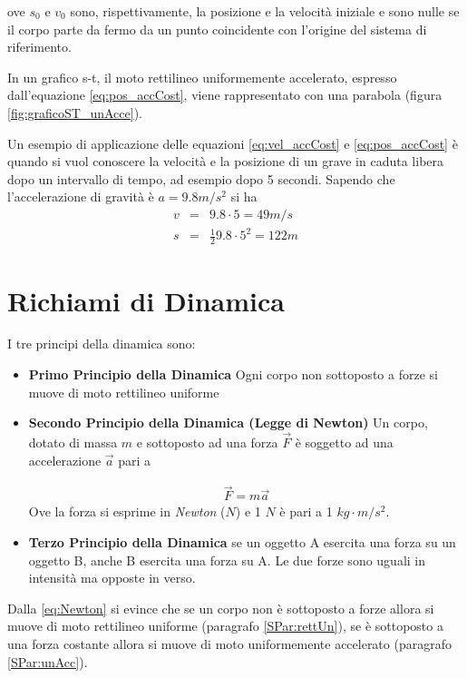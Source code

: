 \documentclass[17pt]{extarticle}
\begin{document}
ove $s_0$ e $v_0$ sono, rispettivamente, la posizione e la velocità iniziale e sono nulle se il corpo parte da fermo da un punto coincidente con l'origine del sistema di riferimento. 

In un grafico s-t, il moto rettilineo uniformemente accelerato, espresso dall'equazione \ref{eq:pos_accCost}, viene rappresentato con una parabola (figura \ref{fig:graficoST_unAcce}).



Un esempio di applicazione delle equazioni \ref{eq:vel_accCost} e \ref{eq:pos_accCost} è quando si vuol conoscere la velocità e la posizione di un grave in caduta libera dopo un intervallo di tempo, ad esempio dopo 5 secondi. Sapendo che l'accelerazione di gravità è $a = 9.8m/s^2$ si ha
\begin{eqnarray}
	v & = & 9.8\cdot 5 = 49 m/s\\
	s & = & \frac{1}{2}9.8\cdot 5^2 = 122 m
\end{eqnarray}



\section{Richiami di Dinamica}
I tre principi della dinamica sono:

\begin{itemize}
	\item {\bf Primo Principio della Dinamica}
	Ogni corpo non sottoposto a forze si muove di moto rettilineo uniforme
	\item {\bf Secondo Principio della Dinamica (Legge di Newton)}
	Un corpo, dotato di massa $m$ e sottoposto ad una forza $\vec{F}$ è soggetto ad una accelerazione $\vec{a}$ pari a 
	
	\begin{eqnarray}\label{eq:Newton}
		\vec{F} = m \vec{a}
	\end{eqnarray}	
	Ove la forza si esprime in \emph{Newton} ($N$) e 1 $N$ è pari a 1 $kg\cdot m/s^2$.
	\item {\bf Terzo Principio della Dinamica}	
		se un oggetto A esercita una forza su un oggetto B, anche B esercita una forza su A. Le due forze sono uguali in intensità ma opposte in verso.
\end{itemize}


Dalla \ref{eq:Newton} si evince che se un corpo non è sottoposto a forze allora si muove di moto rettilineo uniforme (paragrafo \ref{SPar:rettUn}), se è sottoposto a una forza costante allora si muove di moto uniformemente accelerato (paragrafo \ref{SPar:unAcc}).
\end{document}
